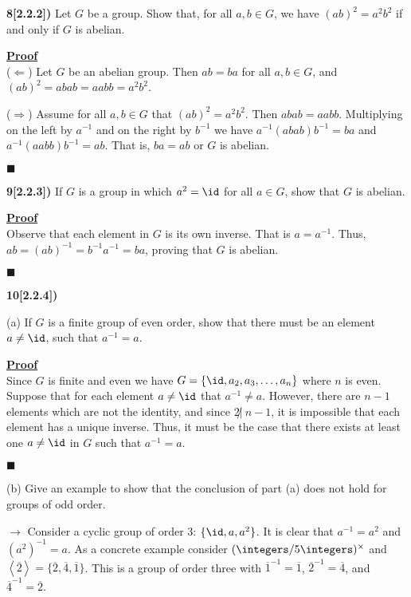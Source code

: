 \documentclass[12pt,a4paper]{article}
\newcommand{\prob}[2]{\textbf{#1)} #2}
\newenvironment{proof}
{
\textbf{\underline{Proof}} \\
}
{
\begin{flushright}
$\blacksquare$
\end{flushright}}
\begin{document}
\prob{8[2.2.2]}{Let $G$ be a group. Show that, for all $a,b\in G$, we have $(ab)^2 = a^2b^2$ if and only if $G$ is abelian.}

\begin{proof}
($\Leftarrow$) Let $G$ be an abelian group. Then $ab = ba$ for all $a,b \in G$, and $(ab)^2 = abab = aabb = a^2b^2$.

($\Rightarrow$) Assume for all $a,b \in G$ that $(ab)^2 = a^2b^2$. Then $abab = aabb$. Multiplying on the left by $a^{-1}$ and on the right by $b^{-1}$ we have $a^{-1}(abab)b^{-1} = ba$ and $a^{-1}(aabb)b^{-1} = ab$. That is, $ba = ab$ or $G$ is abelian.
\end{proof}

\prob{9[2.2.3]}{If $G$ is a group in which $a^2 = \id$ for all $a \in G$, show that $G$ is abelian.}

\begin{proof}
Observe that each element in $G$ is its own inverse. That is $a=a^{-1}$. Thus, $ab = (ab)^{-1} = b^{-1}a^{-1} = ba$, proving that $G$ is abelian.
\end{proof}

\prob{10[2.2.4]}{}

(a) If $G$ is a finite group of even order, show that there must be an element $a \not= \id$, such that $a^{-1} = a$. 

\begin{proof}
Since $G$ is finite and even we have $G = \{\id,a_2,a_3,\hdots,a_n\}$ where $n$ is even. Suppose that for each element $a \not= \id$ that $a^{-1} \not= a$. However, there are $n-1$ elements which are not the identity, and since $2 \not|~n-1$, it is impossible that each element has a unique inverse. Thus, it must be the case that there exists at least one $a \not= \id$ in $G$ such that $a^{-1} = a$.
\end{proof}

(b) Give an example to show that the conclusion of part (a) does not hold for groups of odd order.

$\rightarrow$ Consider a cyclic group of order 3: $\{\id,a,a^2\}$. It is clear that $a^{-1} = a^2$ and $(a^{2})^{-1} = a$. As a concrete example consider $(\integers/5\integers)^{\times}$ and $\left<\overline{2}\right> = \{\overline{2},\overline{4},\overline{1}\}$. This is a group of order three with $\overline{1}^{-1} = \overline{1}$, $\overline{2}^{-1} = \overline{4}$, and $\overline{4}^{-1} = \overline{2}$.
\end{document}
